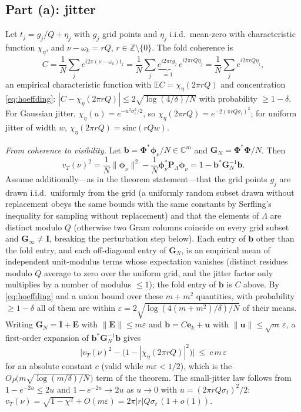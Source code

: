 \documentclass[10pt]{article}
\newcommand{\C}{\mathbb{C}}
\newcommand{\Z}{\mathbb{Z}}
\newcommand{\Lam}{\Lambda}
\newcommand{\Phimat}{\bm{\Phi}}
\newcommand{\norm}[1]{\lVert#1\rVert}
\newcommand{\vt}{v_T}
\begin{document}
\subsection{Part (a): jitter}

Let $t_j=g_j/Q+\eta_j$ with $g_j$ grid points and $\eta_j$ i.i.d.\ mean-zero with
characteristic function $\chi_\eta$, and $\nu-\omega_k=rQ$, $r\in\Z\setminus\{0\}$.  The
fold coherence is
\[
C=\frac1N\sum_je^{i2\pi(\nu-\omega_k)t_j}
 =\frac1N\sum_j\underbrace{e^{i2\pi rg_j}}_{=1}\,e^{i2\pi rQ\eta_j}
 =\frac1N\sum_je^{i2\pi rQ\eta_j},
\]
an empirical characteristic function with $\mathbb E C=\chi_\eta(2\pi rQ)$ and
concentration \eqref{eq:hoeffding}: $|C-\chi_\eta(2\pi rQ)|\le
2\sqrt{\log(4/\delta)/N}$ with probability $\ge1-\delta$.  For Gaussian jitter,
$\chi_\eta(u)=e^{-u^2\sigma_t^2/2}$, so $\chi_\eta(2\pi rQ)=e^{-2(\pi rQ\sigma_t)^2}$;
for uniform jitter of width $w$, $\chi_\eta(2\pi rQ)=\mathrm{sinc}(rQw)$.

\emph{From coherence to visibility.}  Let $\bm b=\Phimat^{*}\bm\phi_\nu/N\in\C^m$ and
$\bm G_N=\Phimat^{*}\Phimat/N$.  Then
\[
\vt(\nu)^2=\frac1N\norm{\bm\phi_\nu}^2-\frac1N\bm\phi_\nu^{*}\bm P_\Lam\bm\phi_\nu
=1-\bm b^{*}\bm G_N^{-1}\bm b .
\]
Assume additionally---as in the theorem statement---that the grid points $g_j$ are drawn
i.i.d.\ uniformly from the grid (a uniformly random subset drawn without replacement
obeys the same bounds with the same constants by Serfling's inequality for sampling
without replacement) and that the elements of $\Lam$ are distinct modulo $Q$ (otherwise
two Gram columns coincide on every grid subset and $\bm G_\infty\neq\bm I$, breaking the
perturbation step below).  Each entry of
$\bm b$ other than the fold entry, and each off-diagonal entry of $\bm G_N$, is an
empirical mean of independent unit-modulus terms whose expectation vanishes (distinct
residues modulo $Q$ average to zero over the uniform grid, and the jitter factor only
multiplies by a number of modulus $\le1$); the fold entry of $\bm b$ is $C$ above.  By
\eqref{eq:hoeffding} and a union bound over these $m+m^2$ quantities, with probability
$\ge1-\delta$ all of them are within
$\varepsilon=2\sqrt{\log(4(m+m^2)/\delta)/N}$ of their means.  Writing
$\bm G_N=\bm I+\bm E$ with $\norm{\bm E}\le m\varepsilon$ and
$\bm b=C\bm e_k+\bm u$ with $\norm{\bm u}\le\sqrt m\,\varepsilon$, a first-order
expansion of $\bm b^{*}\bm G_N^{-1}\bm b$ gives
\[
\big|\vt(\nu)^2-\big(1-|\chi_\eta(2\pi rQ)|^2\big)\big|
\ \le\ c\,m\,\varepsilon
\]
for an absolute constant $c$ (valid while $m\varepsilon<1/2$), which is the
$O_P\!\big(m\sqrt{\log(m/\delta)/N}\big)$ term of the theorem.  The small-jitter law
follows from $1-e^{-2u}\le 2u$ and $1-e^{-2u}\to 2u$ as $u\to0$ with
$u=(2\pi rQ\sigma_t)^2/2$:
$\vt(\nu)=\sqrt{1-\chi^2}+O(m\varepsilon)=2\pi|r|Q\sigma_t\,(1+o(1))$.
\end{document}
